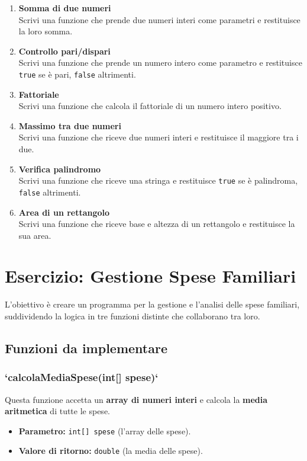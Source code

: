 \documentclass{article}
\begin{document}
\begin{enumerate}
    \item \textbf{Somma di due numeri} \\
    Scrivi una funzione che prende due numeri interi come parametri e restituisce la loro somma.

    \item \textbf{Controllo pari/dispari} \\
    Scrivi una funzione che prende un numero intero come parametro e restituisce \texttt{true} se è pari, \texttt{false} altrimenti.

    \item \textbf{Fattoriale} \\
    Scrivi una funzione che calcola il fattoriale di un numero intero positivo.

    \item \textbf{Massimo tra due numeri} \\
    Scrivi una funzione che riceve due numeri interi e restituisce il maggiore tra i due.

    \item \textbf{Verifica palindromo} \\
    Scrivi una funzione che riceve una stringa e restituisce \texttt{true} se è palindroma, \texttt{false} altrimenti.

    \item \textbf{Area di un rettangolo} \\
    Scrivi una funzione che riceve base e altezza di un rettangolo e restituisce la sua area.

\end{enumerate}

    \section*{Esercizio: Gestione Spese Familiari}

    L'obiettivo è creare un programma per la gestione e l'analisi delle spese familiari, suddividendo la logica in tre funzioni distinte che collaborano tra loro.

    \subsection*{Funzioni da implementare}

    \subsubsection*{`calcolaMediaSpese(int[] spese)`}
    Questa funzione accetta un \textbf{array di numeri interi} e calcola la \textbf{media aritmetica} di tutte le spese.
    \begin{itemize}
        \item \textbf{Parametro:} \texttt{int[] spese} (l'array delle spese).
        \item \textbf{Valore di ritorno:} \texttt{double} (la media delle spese).
    \end{itemize}
\end{document}

